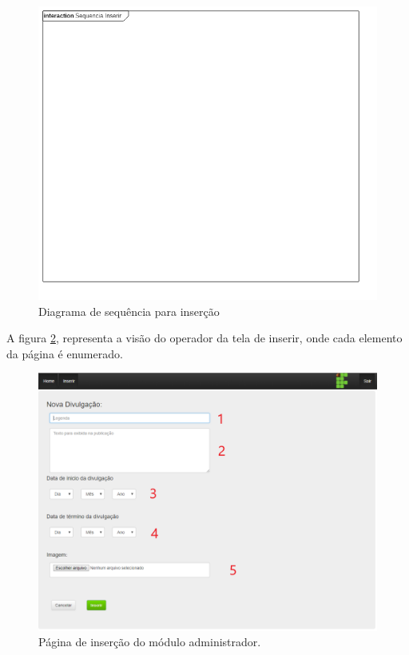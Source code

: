  \begin{figure}[H]
\centering
\includegraphics[scale=0.5]{figuras/sequenciainserir}
\caption{Diagrama de sequência para inserção}
\label{fig:sequenciainserir}
\end{figure}

A figura \ref{fig:administrador1}, representa a visão do operador da tela de inserir, onde cada elemento da página é enumerado.

\begin{figure}[H]
\centering
\includegraphics[scale=0.5]{figuras/administrador1}
\caption{Página de inserção do módulo administrador.}
\label{fig:administrador1}
\end{figure}

